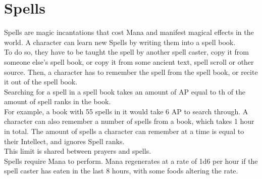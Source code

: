 \chapter*{Spells}\label{ch:spells}
Spells are magic incantations that cost Mana and manifest magical effects in the world.
A character can learn new Spells by writing them into a spell book.\\
To do so, they have to be taught the spell by another spell caster, copy it from someone else's spell book, or copy it from some ancient text, spell scroll or other source.
Then, a character has to remember the spell from the spell book, or recite it out of the spell book.\\
Searching for a spell in a spell book takes an amount of AP equal to th of the amount of spell ranks in the book.\\
For example, a book with 55 spells in it would take 6 AP to search through.
A character can also remember a number of spells from a book, which takes 1 hour in total.
The amount of spells a character can remember at a time is equal to their Intellect, and ignores Spell ranks.\\
This limit is shared between prayers and spells.\\
Spells require Mana to perform.
Mana regenerates at a rate of 1d6 per hour if the spell caster has eaten in the last 8 hours, with some foods altering the rate.\\

	

	
	
	

	
	
	
	
	
	
	
	
	
	
	
	
	
	
	
	
	
	
	
